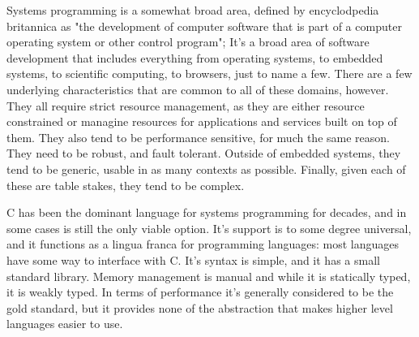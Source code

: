 \documentclass[conference]{IEEEtran}
\begin{document}
 {
  Systems programming is a somewhat broad area, defined by encyclodpedia britannica as "the development of computer software that is part of a computer operating system or other control program"\cite{SystemsProgrammingDefinition}; It's a broad area of software development that includes everything from operating systems, to embedded systems, to scientific computing, to browsers, just to name a few.
  There are a few underlying characteristics that are common to all of these domains, however. They all require strict resource management, as they are either resource constrained or managine resources for applications and services built on top of them. They also tend to be performance sensitive, for much the same reason. They need to be robust, and fault tolerant. Outside of embedded systems, they tend to be generic, usable in as many contexts as possible. Finally, given each of these are table stakes, they tend to be complex.
 }

 {
  C has been the dominant language for systems programming for decades, and in some cases is still the only viable option. It's support is to some degree universal, and it functions as a lingua franca for programming languages: most languages have some way to interface with C. It's syntax is simple, and it has a small standard library. Memory management is manual and while it is statically typed, it is weakly typed. In terms of performance it's generally considered to be the gold standard, but it provides none of the abstraction that makes higher level languages easier to use.
 }
\end{document}
